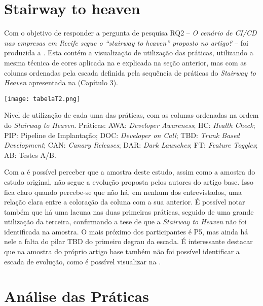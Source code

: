 \section{Stairway to heaven}

Com o objetivo de responder a pergunta de pesquisa RQ2 -- \emph{O cenário de CI/CD nas empresas em Recife segue o ``stairway to heaven'' proposto no artigo?} -- foi produzida a . Esta contém a visualização de utilização das práticas, utilizando a mesma técnica de cores aplicada na  e explicada na seção anterior, mas com as colunas ordenadas pela escada definida pela sequência de práticas do \emph{Stairway to Heaven} apresentada na  (Capítulo 3).

\begin{table}[ht]
\begin{center}
\texttt{[image: tabelaT2.png]}
\end{center}
\caption[Nível de utilização das práticas, com as colunas na ordem do \emph{Stairway to Heaven}]{
    Nível de utilização de cada uma das práticas, com as colunas ordenadas na ordem do \emph{Stairway to Heaven}. Práticas: AWA: \emph{Developer Awareness}; HC: \emph{Health Check}; PIP: Pipeline de Implantação; DOC: \emph{Developer on Call}; TBD: \emph{Trunk Based Development}; CAN: \emph{Canary Releases}; DAR: \emph{Dark Launches}; FT: \emph{Feature Toggles}; AB: Testes A/B.
}\label{tabela_t2}
\end{table}

Com a  é possível perceber que a amostra deste estudo, assim como a amostra do estudo original, não segue a evolução proposta pelos autores do artigo base. Isso fica claro quando percebe-se que não há, em nenhum dos entrevistados, uma relação clara entre a coloração da coluna com a sua anterior. É possível notar também que há uma lacuna nas duas primeiras práticas, seguido de uma grande utilização da terceira, confirmando a tese de que a \emph{Stairway to Heaven} não foi identificada na amostra. O mais próximo dos participantes é P5, mas ainda há nele a falta do pilar TBD do primeiro degrau da escada. É interessante destacar que na amostra do próprio artigo base também não foi possível identificar a escada de evolução, como é possível visualizar na .

\section{Análise das Práticas}

